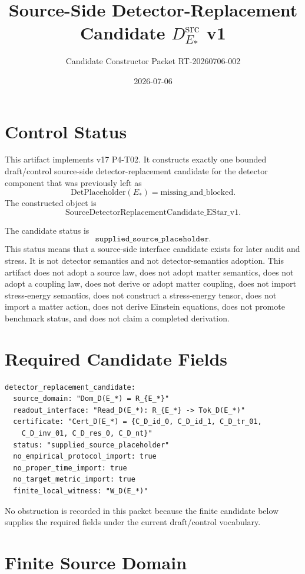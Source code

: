 \documentclass[11pt]{article}
\title{Source-Side Detector-Replacement Candidate \(D^{\mathrm{src}}_{E_{\ast}}\) v1}
\author{Candidate Constructor Packet RT-20260706-002}
\date{2026-07-06}
\newcommand{\EStar}{E_{\ast}}
\newcommand{\DetPlaceholder}{\mathrm{DetPlaceholder}}
\begin{document}
\maketitle

\section{Control Status}

This artifact implements v17 P4-T02. It constructs exactly one bounded
draft/control source-side detector-replacement candidate for the detector
component that was previously left as
\[
  \DetPlaceholder(\EStar)=\mathrm{missing\_and\_blocked}.
\]
The constructed object is
\[
  \mathrm{SourceDetectorReplacementCandidate\_EStar\_v1}.
\]

The candidate status is
\[
  \texttt{supplied\_source\_placeholder}.
\]
This status means that a source-side interface candidate exists for later
audit and stress. It is not detector semantics and not detector-semantics
adoption. This artifact does not adopt a source law, does not adopt matter
semantics, does not adopt a coupling law, does not derive or adopt matter
coupling, does not import stress-energy semantics, does not construct a
stress-energy tensor, does not import a matter action, does not derive
Einstein equations, does not promote benchmark status, and does not claim a
completed derivation.

\section{Required Candidate Fields}

\begin{verbatim}
detector_replacement_candidate:
  source_domain: "Dom_D(E_*) = R_{E_*}"
  readout_interface: "Read_D(E_*): R_{E_*} -> Tok_D(E_*)"
  certificate: "Cert_D(E_*) = {C_D_id_0, C_D_id_1, C_D_tr_01,
    C_D_inv_01, C_D_res_0, C_D_nt}"
  status: "supplied_source_placeholder"
  no_empirical_protocol_import: true
  no_proper_time_import: true
  no_target_metric_import: true
  finite_local_witness: "W_D(E_*)"
\end{verbatim}

No obstruction is recorded in this packet because the finite candidate below
supplies the required fields under the current draft/control vocabulary.

\section{Finite Source Domain}
\end{document}
